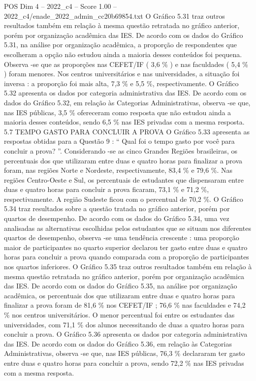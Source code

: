 \begin{textsample}{POS Dim 4 – 2022\_c4 – Score 1.00 – 2022\_c4/enade\_2022\_admin\_cc20b69854.txt}
O Gráfico 5.31 traz outros resultados também em relação à mesma questão retratada no gráfico anterior, porém por organização acadêmica das IES.
De acordo com os dados do Gráfico 5.31, na análise por organização acadêmica, a proporção de respondentes que escolheram a opção não estudou ainda a maioria desses conteúdos foi pequena.
Observa -se que as proporções nas CEFET/IF ( 3,6 \% ) e nas faculdades ( 5,4 \% ) foram menores.
Nos centros universitários e nas universidades, a situação foi inversa : a proporção foi mais alta, 7,3 \% e 5,5 \%, respectivamente.
O Gráfico 5.32 apresenta os dados por categoria administrativa das IES.
De acordo com os dados do Gráfico 5.32, em relação às Categorias Administrativas, observa -se que, nas IES públicas, 3,5 \% ofereceram como resposta que não estudou ainda a maioria desses conteúdos, sendo 6,5 \% nas IES privadas com a mesma resposta. 5.7 TEMPO GASTO PARA CONCLUIR A PROVA O Gráfico 5.33 apresenta as respostas obtidas para a Questão 9 : “ Qual foi o tempo gasto por você para concluir a prova? ”.
Considerando -se as cinco Grandes Regiões brasileiras, os percentuais dos que utilizaram entre duas e quatro horas para finalizar a prova foram, nas regiões Norte e Nordeste, respectivamente, 83,4 \% e 79,6 \%.
Nas regiões Centro-Oeste e Sul, os percentuais de estudantes que dispensaram entre duas e quatro horas para concluir a prova ficaram, 73,1 \% e 71,2 \%, respectivamente.
A região Sudeste ficou com o percentual de 70,2 \%.
O Gráfico 5.34 traz resultados sobre a questão tratada no gráfico anterior, porém por quartos de desempenho.
De acordo com os dados do Gráfico 5.34, uma vez analisadas as alternativas escolhidas pelos estudantes que se situam nos diferentes quartos de desempenho, observa -se uma tendência crescente : uma proporção maior de participantes no quarto superior declarou ter gasto entre duas e quatro horas para concluir a prova quando comparada com a proporção de participantes nos quartos inferiores.
O Gráfico 5.35 traz outros resultados também em relação à mesma questão retratada no gráfico anterior, porém por organização acadêmica das IES.
De acordo com os dados do Gráfico 5.35, na análise por organização acadêmica, os percentuais dos que utilizaram entre duas e quatro horas para finalizar a prova foram de 81,6 \% nos CEFET/IF ; 76,6 \% nas faculdades e 74,2 \% nos centros universitários.
O menor percentual foi entre os estudantes das universidades, com 71,1 \% dos alunos necessitando de duas a quatro horas para concluir a prova.
O Gráfico 5.36 apresenta os dados por categoria administrativa das IES.
De acordo com os dados do Gráfico 5.36, em relação às Categorias Administrativas, observa -se que, nas IES públicas, 76,3 \% declararam ter gasto entre duas e quatro horas para concluir a prova, sendo 72,2 \% nas IES privadas com a mesma resposta.

\end{textsample}
